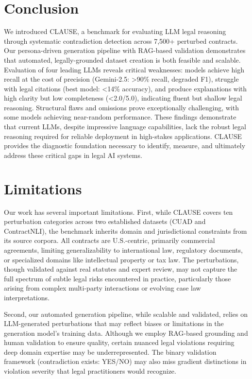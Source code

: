 \documentclass[11pt]{article}
\newcommand{\datasetName}{{\sc CLAUSE}\xspace}
\begin{document}
\section{Conclusion}
We introduced \datasetName, a benchmark for evaluating LLM legal reasoning through systematic contradiction detection across 7,500+ perturbed contracts. Our persona-driven generation pipeline with RAG-based validation demonstrates that automated, legally-grounded dataset creation is both feasible and scalable. Evaluation of four leading LLMs reveals critical weaknesses: models achieve high recall at the cost of precision (Gemini-2.5: >90\% recall, degraded F1), struggle with legal citations (best model: <14\% accuracy), and produce explanations with high clarity but low completeness (<2.0/5.0), indicating fluent but shallow legal reasoning. Structural flaws and omissions prove exceptionally challenging, with some models achieving near-random performance. These findings demonstrate that current LLMs, despite impressive language capabilities, lack the robust legal reasoning required for reliable deployment in high-stakes applications. \datasetName provides the diagnostic foundation necessary to identify, measure, and ultimately address these critical gaps in legal AI systems.

\section{Limitations}
Our work has several important limitations. First, while \datasetName covers ten perturbation categories across two established datasets (CUAD and ContractNLI), the benchmark inherits domain and jurisdictional constraints from its source corpora. All contracts are U.S.-centric, primarily commercial agreements, limiting generalizability to international law, regulatory documents, or specialized domains like intellectual property or tax law. The perturbations, though validated against real statutes and expert review, may not capture the full spectrum of subtle legal risks encountered in practice, particularly those arising from complex multi-party interactions or evolving case law interpretations.

Second, our automated generation pipeline, while scalable and validated, relies on LLM-generated perturbations that may reflect biases or limitations in the generation model's training data. Although we employ RAG-based grounding and human validation to ensure quality, certain nuanced legal violations requiring deep domain expertise may be underrepresented. The binary validation framework (contradiction exists: YES/NO) may also miss gradient distinctions in violation severity that legal practitioners would recognize.
\end{document}
